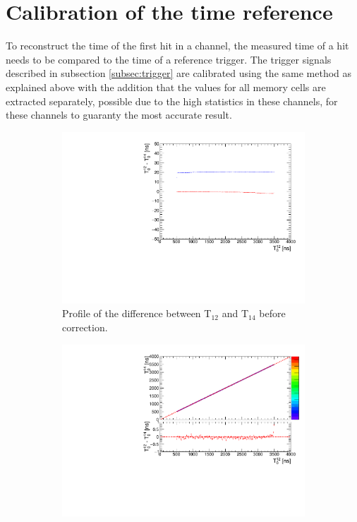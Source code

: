 \section{Calibration of the time reference}
\label{section:time_ref}

To reconstruct the time of the first hit in a channel, the measured time of a hit needs to be compared to the time of a reference trigger. The trigger signals described in subsection \ref{subsec:trigger} are calibrated using the same method as explained above with the addition that the values for all memory cells are extracted separately, possible due to the high statistics in these channels, for these channels to guaranty the most accurate result.

\begin{figure}[htbp!]
	\begin{subfigure}[t]{0.5\textwidth}
		\centering
		\includegraphics[width=1\linewidth]{../Thesis_Plots/Timing/T0s/Plots/Profiles_DeviationT0_12_14}
		\caption{Profile of the difference between T$_{12}$ and T$_{14}$ before correction.} \label{fig:DeviationProfileT0s}
	\end{subfigure}
	\hfill
	\begin{subfigure}[t]{0.5\textwidth}
		\centering
		\includegraphics[width=1\textwidth]{../Thesis_Plots/Timing/T0s/Plots/Correlation_T12vsT14_TDC2ns.pdf}

\end{subfigure}
\end{figure}
